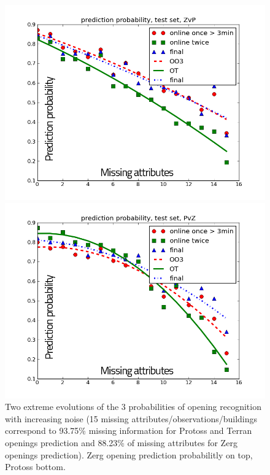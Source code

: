 \begin{figure}[htp]
\centerline{\includegraphics[width=1.0\columnwidth]{images/ZvP2.png}}
\vspace{-0.2cm}
\centerline{\includegraphics[width=1.0\columnwidth]{images/PvZ2.png}}
\vspace{-0.3cm}
\caption{Two extreme evolutions of the 3 probabilities of opening recognition with increasing noise (15 missing attributes/observations/buildings correspond to 93.75\% missing information for Protoss and Terran openings prediction and 88.23\% of missing attributes for Zerg openings prediction). Zerg opening prediction probabilitly on top, Protoss bottom.}
\label{noise}
\end{figure}

